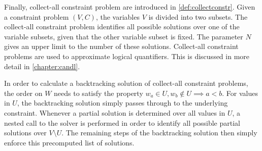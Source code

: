     Finally, collect-all constraint problem are introduced in
    \autoref{def:collectconstr}.
    Given a constraint problem $(V,C)$, the variables $V$ is divided into
    two subsets.
    The collect-all constraint problem identifies all possible solutions over
    one of the variable subsets, given that the other variable subset is fixed.
    The parameter $N$ gives an upper limit to the number of these solutions.
    Collect-all constraint problems are used to approximate logical quantifiers.
    This is discussed in more detail in \autoref{chapter:candl}.

    In order to calculate a backtracking solution of collect-all constraint
    problems, the order on $W$ needs to satisfy the property
    $w_a\in U,w_b\notin U\implies a<b$.
    For values in $U$, the backtracking solution simply passes through to the
    underlying constraint.
    Whenever a partial solution is determined over all values in $U$, a nested
    call to the solver is performed in order to identify all possible partial
    solutions over $V\setminus U$.
    The remaining steps of the backtracking solution then simply enforce this
    precomputed list of solutions.

